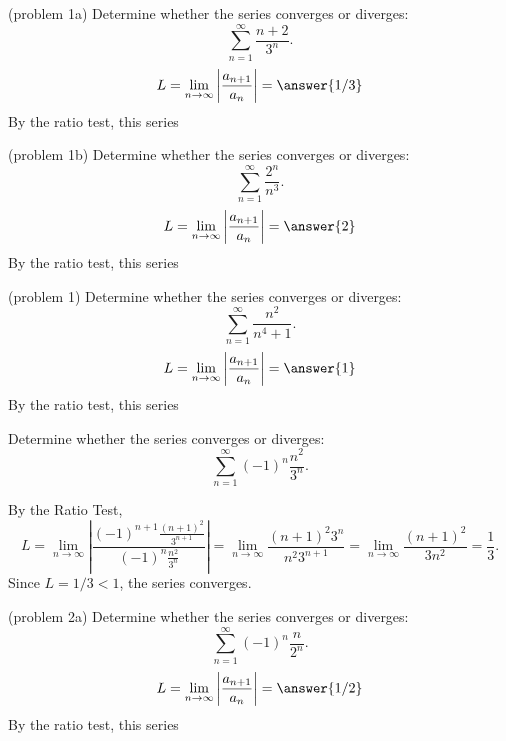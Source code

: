 \documentclass[handout]{ximera}
\begin{document}
\begin{problem}(problem 1a)
Determine whether the series converges or diverges:
\[
\sum_{n=1}^\infty \frac{n+2}{3^n}.
\]
\[
L = \lim_{n \to \infty} \left|\frac{a_{n+1}}{a_n}\right| = \answer{1/3}
\]
By the ratio test, this series 

\end{problem}


\begin{problem}(problem 1b)
Determine whether the series converges or diverges:
\[
\sum_{n=1}^\infty \frac{2^n}{n^3}.
\]
\[
L = \lim_{n \to \infty} \left|\frac{a_{n+1}}{a_n}\right| = \answer{2}
\]
By the ratio test, this series 

\end{problem}



\begin{problem}(problem 1)
Determine whether the series converges or diverges:
\[
\sum_{n=1}^\infty \frac{n^2}{n^4 +1}.
\]
\[
L = \lim_{n \to \infty} \left|\frac{a_{n+1}}{a_n}\right| = \answer{1}
\]
By the ratio test, this series 

\end{problem}


\begin{example}[example 2]
Determine whether the series converges or diverges:
\[
\sum_{n=1}^\infty (-1)^n\frac{n^2}{3^n}.
\]

By the Ratio Test,
\[
L =  \lim_{n \to \infty} \left|\frac{(-1)^{n+1}\frac{(n+1)^2}{3^{n+1}}}{(-1)^n\frac{n^2}{3^n}}\right| =  \lim_{n \to \infty} \frac{(n+1)^2 3^n}{n^2 3^{n+1}} 
=  \lim_{n \to \infty} \frac{(n+1)^2}{3n^2} = \frac13.
\]
Since $L = 1/3 < 1$, the series converges.
\end{example}





\begin{problem}(problem 2a)
Determine whether the series converges or diverges:
\[
\sum_{n=1}^\infty (-1)^n\frac{n}{2^n}.
\]
\[
L = \lim_{n \to \infty} \left|\frac{a_{n+1}}{a_n}\right| = \answer{1/2}
\]
By the ratio test, this series 

\end{problem}
\end{document}
